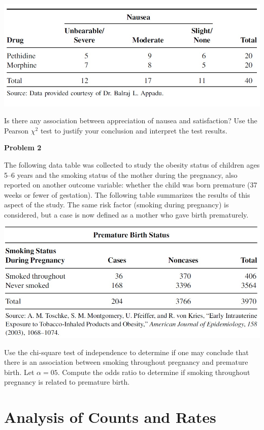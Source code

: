 \documentclass[
]{book}
\begin{document}
\begin{center}\includegraphics[width=0.8\linewidth]{img12/w12-assin-prob01} \end{center}

Is there any association between appreciation of nausea and satisfaction? Use the Pearson \(\chi^2\) test to justify your conclusion and interpret the test results.

\textbf{Problem 2}

The following data table was collected to study the obesity status of children ages 5--6 years and the smoking status of the mother during the pregnancy, also reported on another outcome variable: whether the child was born premature (37 weeks or fewer of gestation). The following table summarizes the results of this aspect of the study. The same risk factor (smoking during pregnancy) is considered, but a case is now defined as a mother who gave birth prematurely.

\begin{center}\includegraphics[width=0.8\linewidth]{img12/w12-assin-prob02} \end{center}

Use the chi-square test of independence to determine if one may conclude that there is an association between smoking throughout pregnancy and premature birth. Let \(\alpha = 05\). Compute the odds ratio to determine if smoking throughout pregnancy is related to premature birth.

\hypertarget{analysis-of-counts-and-rates}{%
\chapter{Analysis of Counts and Rates}\label{analysis-of-counts-and-rates}}
\end{document}
